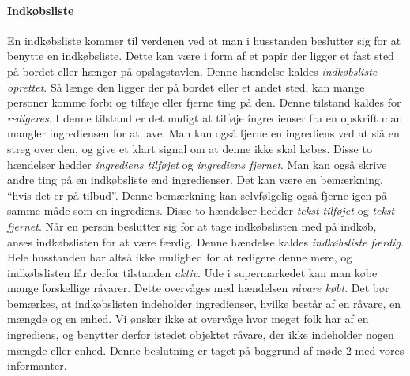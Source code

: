 \paragraph{Indkøbsliste}
En indkøbsliste kommer til verdenen ved at man i husstanden beslutter sig for at benytte en indkøbsliste. Dette kan være i form af et papir der ligger et fast sted på bordet eller hænger på opslagstavlen. Denne hændelse kaldes \textit{indkøbsliste oprettet}. Så længe den ligger der på bordet eller et andet sted, kan mange personer komme forbi og tilføje eller fjerne ting på den. Denne tilstand kaldes for \textit{redigeres}. I denne tilstand er det muligt at tilføje ingredienser fra en opskrift man mangler ingrediensen for at lave. Man kan også fjerne en ingrediens ved at slå en streg over den, og give et klart signal om at denne ikke skal købes. Disse to hændelser hedder \textit{ingrediens tilføjet} og \textit{ingrediens fjernet}. Man kan også skrive andre ting på en indkøbsliste end ingredienser. Det kan være en bemærkning, \fx ``hvis det er på tilbud''. Denne bemærkning kan selvfølgelig også fjerne igen på samme måde som en ingrediens. Disse to hændelser hedder \textit{tekst tilføjet} og \textit{tekst fjernet}. Når en person beslutter sig for at tage indkøbslisten med på indkøb, anses indkøbslisten for at være færdig. Denne hændelse kaldes \textit{indkøbsliste færdig}. Hele husstanden har altså ikke mulighed for at redigere denne mere, og indkøbslisten får derfor tilstanden \textit{aktiv}. Ude i supermarkedet kan man købe mange forskellige råvarer. Dette overvåges med hændelsen \textit{råvare købt}. Det bør bemærkes, at indkøbslisten indeholder ingredienser, hvilke består af en råvare, en mængde og en enhed. Vi ønsker ikke at overvåge hvor meget folk har af en ingrediens, og benytter derfor istedet objektet råvare, der ikke indeholder nogen mængde eller enhed. Denne beslutning er taget på baggrund af møde 2 med vores informanter. 
\begin{figure}[htp]
\centering
\scalebox{0.6}{
}
\label{fig:indkoebsliste-adfaerd}
\end{figure}